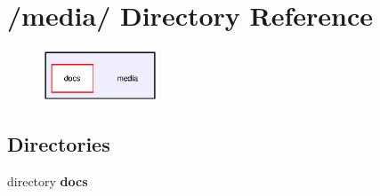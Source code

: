 \section{/media/ Directory Reference}
\label{dir_000000}


\begin{figure}[H]
\begin{center}
\leavevmode
\includegraphics[width=97pt]{dir_000000_dep}
\end{center}
\end{figure}
\subsection*{Directories}
\begin{CompactItemize}
\item 
directory {\bf docs}
\end{CompactItemize}
